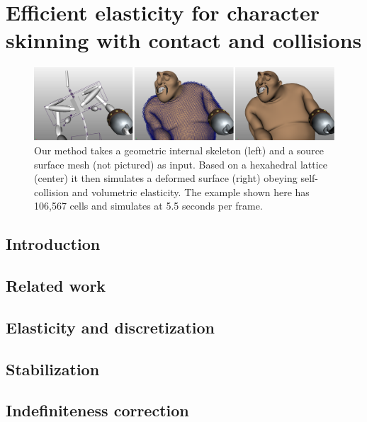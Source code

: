 

\newtheorem{lemma}{Lemma}


\chapter{Efficient elasticity for character skinning with contact and collisions}
\begin{figure}[!ht]
\includegraphics[width=\linewidth]{elasticity/figures/teaser3}
  \caption{Our method takes a geometric internal skeleton (left) and a source
    surface mesh (not pictured) as input. Based on a hexahedral lattice (center)
    it then simulates a deformed surface (right) obeying self-collision and volumetric
    elasticity. The example shown here has 106,567 cells and simulates at 5.5
    seconds per frame.}
\end{figure}

\section{Introduction}
\label{sec:intro}


\section{Related work}
\label{sec:relatedwork}


\section{Elasticity and discretization}
\label{sec:elasticity}


\section{Stabilization}
\label{sec:stabilization}


\section{Indefiniteness correction}
\label{sec:indefiniteness}


